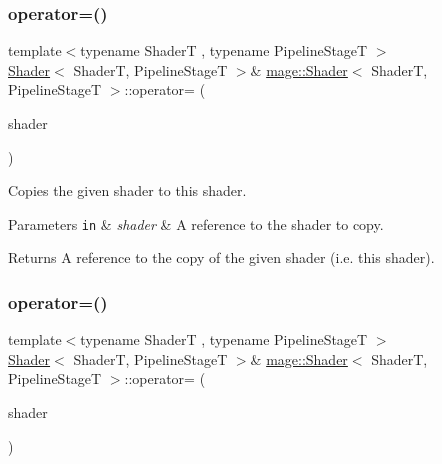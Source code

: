 \subsubsection{\texorpdfstring{operator=()}{operator=()}\hspace{0.1cm}{\footnotesize\ttfamily [1/2]}}
{\footnotesize\ttfamily template$<$typename ShaderT , typename Pipeline\+StageT $>$ \\
\hyperlink{classmage_1_1_shader}{Shader}$<$ ShaderT, Pipeline\+StageT $>$\& \hyperlink{classmage_1_1_shader}{mage\+::\+Shader}$<$ ShaderT, Pipeline\+StageT $>$\+::operator= (\begin{DoxyParamCaption}\item[{const \hyperlink{classmage_1_1_shader}{Shader}$<$ ShaderT, Pipeline\+StageT $>$ \&}]{shader }\end{DoxyParamCaption})\hspace{0.3cm}{\ttfamily [delete]}}

Copies the given shader to this shader.


\begin{DoxyParams}[1]{Parameters}
\mbox{\tt in}  & {\em shader} & A reference to the shader to copy. \\
\hline
\end{DoxyParams}
\begin{DoxyReturn}{Returns}
A reference to the copy of the given shader (i.\+e. this shader). 
\end{DoxyReturn}
\hypertarget{classmage_1_1_shader_a2fa066425e397523b3ce181e5dc46c9d}{}\label{classmage_1_1_shader_a2fa066425e397523b3ce181e5dc46c9d} 
\subsubsection{\texorpdfstring{operator=()}{operator=()}\hspace{0.1cm}{\footnotesize\ttfamily [2/2]}}
{\footnotesize\ttfamily template$<$typename ShaderT , typename Pipeline\+StageT $>$ \\
\hyperlink{classmage_1_1_shader}{Shader}$<$ ShaderT, Pipeline\+StageT $>$\& \hyperlink{classmage_1_1_shader}{mage\+::\+Shader}$<$ ShaderT, Pipeline\+StageT $>$\+::operator= (\begin{DoxyParamCaption}\item[{\hyperlink{classmage_1_1_shader}{Shader}$<$ ShaderT, Pipeline\+StageT $>$ \&\&}]{shader }\end{DoxyParamCaption})\hspace{0.3cm}{\ttfamily [delete]}}

